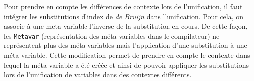                 Pour prendre en compte les différences de contexte lors de l'unification, il faut intégrer
                les substitutions d'index de \textit{de Bruijn} dans l'unification.
                Pour cela, on associe à une meta-variable l'inverse de la substitution en cours. De cette
                façon, les \texttt{Metavar} (représentation des méta-variables dans le compilateur) ne représentent plus
                des méta-variables mais l'application d'une substitution à une méta-variable.
                Cette modification permet de prendre en compte le contexte dans lequel la méta-variable a été créée
                et ainsi de pouvoir appliquer les substitutions lors de l'unification de variables dans des contextes différents.

